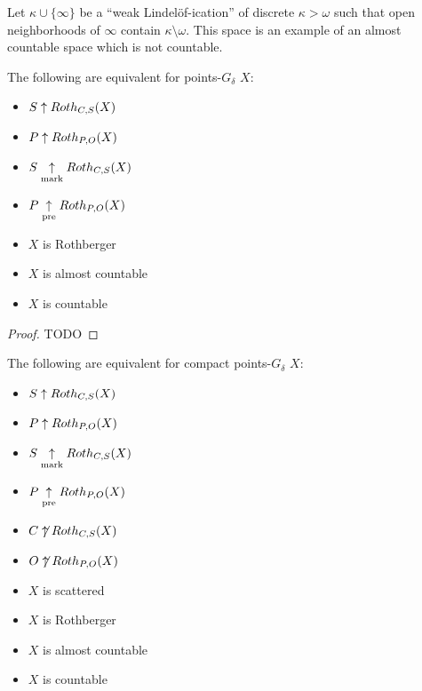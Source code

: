 Let $\kappa\cup\{\infty\}$ be a ``weak Lindel\"of-ication'' of
discrete $\kappa>\omega$ such that open neighborhoods of $\infty$ contain
$\kappa\setminus\omega$. This space is an example of an almost countable
space which is not countable.

\begin{thm}
  The following are equivalent for points-$G_\delta$ $X$:
    \begin{itemize}
      \item $S\uparrow Roth_{C,S}(X)$
      \item $P\uparrow Roth_{P,O}(X)$
      \item $S\underset{\text{mark}}{\uparrow}Roth_{C,S}(X)$
      \item $P\underset{\text{pre}}{\uparrow}Roth_{P,O}(X)$
      \item $X$ is Rothberger
      \item $X$ is almost countable
      \item $X$ is countable
    \end{itemize}
\end{thm}

\begin{proof}
  TODO
\end{proof}

\begin{cor}
  The following are equivalent for compact points-$G_\delta$ $X$:
    \begin{itemize}
      \item $S\uparrow Roth_{C,S}(X)$
      \item $P\uparrow Roth_{P,O}(X)$
      \item $S\underset{\text{mark}}{\uparrow}Roth_{C,S}(X)$
      \item $P\underset{\text{pre}}{\uparrow}Roth_{P,O}(X)$
      \item $C\not\uparrow Roth_{C,S}(X)$
      \item $O\not\uparrow Roth_{P,O}(X)$
      \item $X$ is scattered
      \item $X$ is Rothberger
      \item $X$ is almost countable
      \item $X$ is countable
    \end{itemize}
\end{cor}